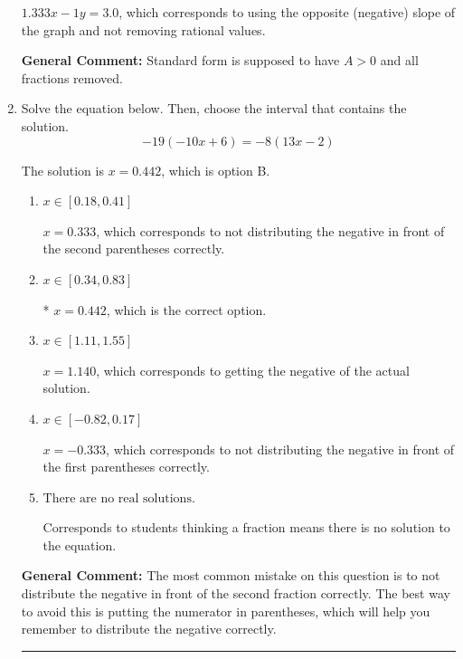 \documentclass{extbook}[14pt]
\newcommand{\litem}[1]{\item #1

\rule{\textwidth}{0.4pt}}
\begin{document}
\begin{enumerate}
{\begin{enumerate}[label=\Alph*.]
 $1.333x - 1y = 3.0$, which corresponds to using the opposite (negative) slope of the graph and not removing rational values.
\end{enumerate}

\textbf{General Comment:} Standard form is supposed to have $A > 0$ and all fractions removed.
}
\litem{
Solve the equation below. Then, choose the interval that contains the solution.
\[ -19(-10x + 6) = -8(13x -2) \]

The solution is \( x = 0.442 \), which is option B.\begin{enumerate}[label=\Alph*.]
\item \( x \in [0.18, 0.41] \)

$x = 0.333$, which corresponds to not distributing the negative in front of the second parentheses correctly.
\item \( x \in [0.34, 0.83] \)

* $x = 0.442$, which is the correct option.
\item \( x \in [1.11, 1.55] \)

$x = 1.140$, which corresponds to getting the negative of the actual solution.
\item \( x \in [-0.82, 0.17] \)

$x = -0.333$, which corresponds to not distributing the negative in front of the first parentheses correctly.
\item \( \text{There are no real solutions.} \)

Corresponds to students thinking a fraction means there is no solution to the equation.
\end{enumerate}

\textbf{General Comment:} The most common mistake on this question is to not distribute the negative in front of the second fraction correctly. The best way to avoid this is putting the numerator in parentheses, which will help you remember to distribute the negative correctly.
}
\end{enumerate}
\end{document}
